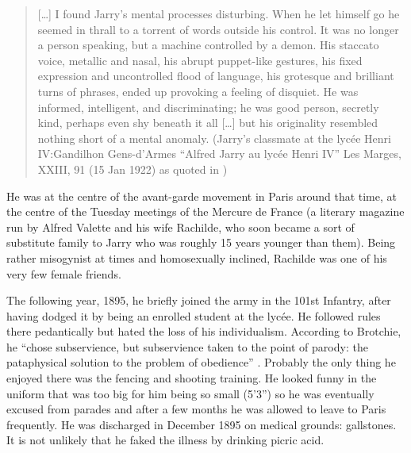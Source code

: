 \begin{quote}
  [\ldots] I found Jarry's mental processes disturbing. When he let himself go he seemed in thrall to a torrent of words outside his control. It was no longer a person speaking, but a machine controlled by a demon. His staccato voice, metallic and nasal, his abrupt puppet-like gestures, his fixed expression and uncontrolled flood of language, his grotesque and brilliant turns of phrases, ended up provoking a feeling of disquiet. He was informed, intelligent, and discriminating; he was good person, secretly kind, perhaps even shy beneath it all [\ldots] but his originality resembled nothing short of a mental anomaly. (Jarry's classmate at the lycée Henri IV:\@ Gandilhon Gens-d'Armes ``Alfred Jarry au lycée Henri IV'' Les Marges, XXIII, 91 (15 Jan 1922) as quoted in \citep{Brotchie2011})
\end{quote}

He was at the centre of the avant-garde movement in Paris around that time, at the centre of the Tuesday meetings of the Mercure de France (a literary magazine run by Alfred Valette and his wife Rachilde, who soon became a sort of substitute family to Jarry who was roughly 15 years younger than them). Being rather misogynist at times and homosexually inclined, Rachilde was one of his very few female friends.

The following year, 1895, he briefly joined the army in the 101st Infantry, after having dodged it by being an enrolled student at the lycée. He followed rules there pedantically but hated the loss of his individualism. According to Brotchie, he ``chose subservience, but subservience taken to the point of parody: the pataphysical solution to the problem of obedience'' \citep{Brotchie2011}. Probably the only thing he enjoyed there was the fencing and shooting training. He looked funny in the uniform that was too big for him being so small (5'3'') so he was eventually excused from parades and after a few months he was allowed to leave to Paris frequently. He was discharged in December 1895 on medical grounds: gallstones. It is not unlikely that he faked the illness by drinking picric acid.

